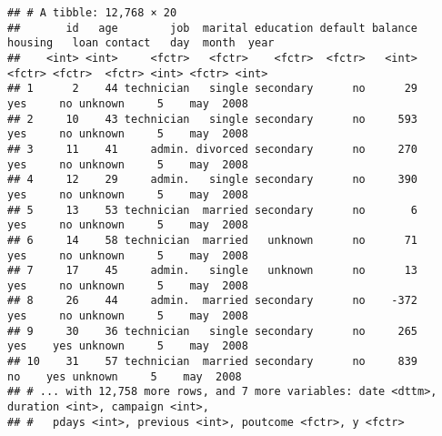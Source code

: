 \documentclass[]{book}
\newenvironment{Shaded}{\begin{snugshade}}{\end{snugshade}}
\newcommand{\KeywordTok}[1]{\textcolor[rgb]{0.13,0.29,0.53}{\textbf{{#1}}}}
\newcommand{\StringTok}[1]{\textcolor[rgb]{0.31,0.60,0.02}{{#1}}}
\newcommand{\CommentTok}[1]{\textcolor[rgb]{0.56,0.35,0.01}{\textit{{#1}}}}
\newcommand{\NormalTok}[1]{{#1}}
\begin{document}
\begin{verbatim}
## # A tibble: 12,768 × 20
##       id   age        job  marital education default balance housing   loan contact   day  month  year
##    <int> <int>     <fctr>   <fctr>    <fctr>  <fctr>   <int>  <fctr> <fctr>  <fctr> <int> <fctr> <int>
## 1      2    44 technician   single secondary      no      29     yes     no unknown     5    may  2008
## 2     10    43 technician   single secondary      no     593     yes     no unknown     5    may  2008
## 3     11    41     admin. divorced secondary      no     270     yes     no unknown     5    may  2008
## 4     12    29     admin.   single secondary      no     390     yes     no unknown     5    may  2008
## 5     13    53 technician  married secondary      no       6     yes     no unknown     5    may  2008
## 6     14    58 technician  married   unknown      no      71     yes     no unknown     5    may  2008
## 7     17    45     admin.   single   unknown      no      13     yes     no unknown     5    may  2008
## 8     26    44     admin.  married secondary      no    -372     yes     no unknown     5    may  2008
## 9     30    36 technician   single secondary      no     265     yes    yes unknown     5    may  2008
## 10    31    57 technician  married secondary      no     839      no    yes unknown     5    may  2008
## # ... with 12,758 more rows, and 7 more variables: date <dttm>, duration <int>, campaign <int>,
## #   pdays <int>, previous <int>, poutcome <fctr>, y <fctr>
\end{verbatim}

\begin{Shaded}
\end{Shaded}
\end{document}

